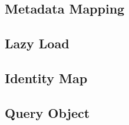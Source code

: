 \documentclass[a4paper,slidestop,xcolor=pst,blue]{beamer}
\begin{document}
\subsection{Metadata Mapping}

\subsection{Lazy Load}

\subsection{Identity Map}

\subsection{Query Object}

%
\end{document}
